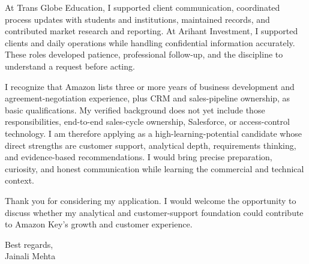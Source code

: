 \documentclass[letterpaper,11pt]{article}
\begin{document}
\bigbreak
At Trans Globe Education, I supported client communication, coordinated process updates with students and institutions, maintained records, and contributed market research and reporting. At Arihant Investment, I supported clients and daily operations while handling confidential information accurately. These roles developed patience, professional follow-up, and the discipline to understand a request before acting.

\bigbreak
I recognize that Amazon lists three or more years of business development and agreement-negotiation experience, plus CRM and sales-pipeline ownership, as basic qualifications. My verified background does not yet include those responsibilities, end-to-end sales-cycle ownership, Salesforce, or access-control technology. I am therefore applying as a high-learning-potential candidate whose direct strengths are customer support, analytical depth, requirements thinking, and evidence-based recommendations. I would bring precise preparation, curiosity, and honest communication while learning the commercial and technical context.

\bigbreak
Thank you for considering my application. I would welcome the opportunity to discuss whether my analytical and customer-support foundation could contribute to Amazon Key's growth and customer experience.

\bigbreak
Best regards,\\
Jainali Mehta
\end{document}

